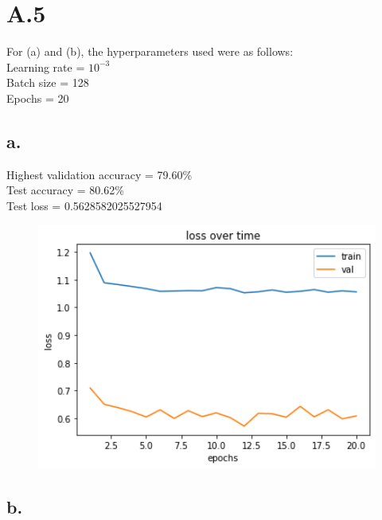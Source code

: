 \documentclass{article}
\newcommand{\1}{\mathbf{1}}
\begin{document}
\newpage
\section*{A.5}
{\Large 

For (a) and (b), the hyperparameters used were as follows: \\
Learning rate = $10^{-3}$ \\
Batch size = 128 \\
Epochs = 20

\subsection*{a.}

Highest validation accuracy = 79.60\% \\
Test accuracy = 80.62\% \\
Test loss = 0.5628582025527954

\begin{figure}[h]
  \centering
  \includegraphics[width=150mm]{../hw3-code/results/a5_a.png}
\end{figure}

\newpage

\subsection*{b.}

}
\end{document}
